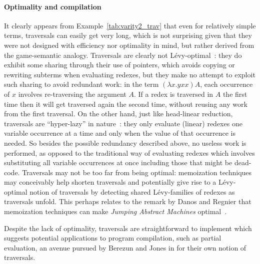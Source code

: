 \documentclass{elsarticle}
\theoremstyle{plain}
\theoremstyle{definition}
\begin{document}
\paragraph{Optimality and compilation}
It clearly appears from Example~\ref{tab:varity2_trav} that even for relatively simple terms, traversals can easily get very long, which is not surprising given that they were not designed with efficiency nor optimality in mind, but rather derived from the game-semantic analogy.
Traversals are clearly not L\'evy-optimal~\cite{optimal-reduction-levy}: they do exhibit some sharing through their use of pointers, which avoids copying or rewriting subterms when evaluating redexes, but they make no attempt to exploit such sharing to avoid redundant work: in the term $(\lambda x. y x x) A$, each occurrence of $x$ involves re-traversing the argument $A$.
If a redex is traversed in $A$ the first time then it will get traversed again the second time, without reusing any work from the first traversal.
%
On the other hand, just like head-linear reduction, traversals are  ``hyper-lazy'' in nature~\cite{danosherbelinregnier1996}: they only evaluate (linear) redexes one variable occurrence at a time and only when the value of that occurrence is needed. So besides the possible redundancy described above, no useless work is performed, as opposed to the traditional
way of evaluating redexes which involves substituting all variable occurrences at once including those that might be dead-code.
%
Traversals may not be too far from being optimal:
memoization techniques may conceivably help shorten traversals
and potentially give rise to a L\'evy-optimal notion of traversals
by detecting shared L\'evy-families of redexes as traversals unfold.
This perhaps relates to the remark by Danos and Regnier that memoization
techniques can make \emph{Jumping Abstract Machines} optimal~\cite{DANOS199979}.

Despite the lack of optimality, traversals are straightforward to implement which suggests potential applications to program compilation, such as partial evaluation, an avenue pursued by Berezun and Jones in \cite{berezunjones_partialevalbytraversals} for their own notion of traversals.


%
\end{document}
